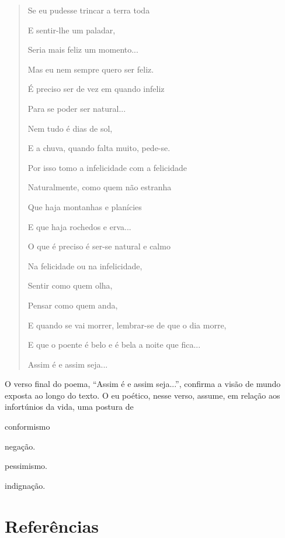 \begin{quote}
Se eu pudesse trincar a terra toda

E sentir-lhe um paladar,

Seria mais feliz um momento...

Mas eu nem sempre quero ser feliz.

É preciso ser de vez em quando infeliz

Para se poder ser natural...

Nem tudo é dias de sol,

E a chuva, quando falta muito, pede-se.

Por isso tomo a infelicidade com a felicidade

Naturalmente, como quem não estranha

Que haja montanhas e planícies

E que haja rochedos e erva...

O que é preciso é ser-se natural e calmo

Na felicidade ou na infelicidade,

Sentir como quem olha,

Pensar como quem anda,

E quando se vai morrer, lembrar-se de que o dia morre,

E que o poente é belo e é bela a noite que fica...

Assim é e assim seja...
\end{quote}


O verso final do poema, ``Assim é e assim seja...'', confirma a visão de
mundo exposta ao longo do texto. O eu poético, nesse verso, assume, em
relação aos infortúnios da vida, uma postura de

\begin{escolha}
\item conformismo

\item negação.

\item pessimismo.

\item indignação.
\end{escolha}

\section{Referências}


